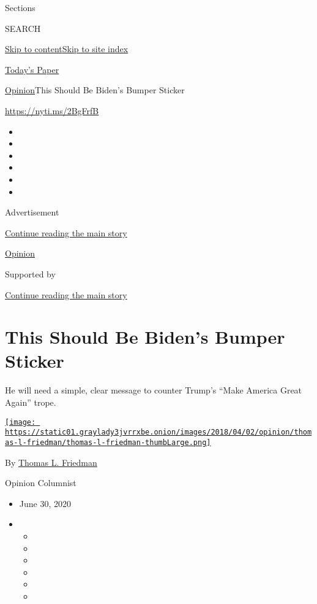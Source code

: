 Sections

SEARCH

\protect\hyperlink{site-content}{Skip to
content}\protect\hyperlink{site-index}{Skip to site index}

\href{https://myaccount.nytimes3xbfgragh.onion/auth/login?response_type=cookie\&client_id=vi}{}

\href{https://www.nytimes3xbfgragh.onion/section/todayspaper}{Today's
Paper}

\href{/section/opinion}{Opinion}\textbar{}This Should Be Biden's Bumper
Sticker

\url{https://nyti.ms/2BgFrfB}

\begin{itemize}
\item
\item
\item
\item
\item
\item
\end{itemize}

Advertisement

\protect\hyperlink{after-top}{Continue reading the main story}

\href{/section/opinion}{Opinion}

Supported by

\protect\hyperlink{after-sponsor}{Continue reading the main story}

\hypertarget{this-should-be-bidens-bumper-sticker}{%
\section{This Should Be Biden's Bumper
Sticker}\label{this-should-be-bidens-bumper-sticker}}

He will need a simple, clear message to counter Trump's ``Make America
Great Again'' trope.

\href{https://www.nytimes3xbfgragh.onion/by/thomas-l-friedman}{\texttt{[image: https://static01.graylady3jvrrxbe.onion/images/2018/04/02/opinion/thomas-l-friedman/thomas-l-friedman-thumbLarge.png]}}

By \href{https://www.nytimes3xbfgragh.onion/by/thomas-l-friedman}{Thomas
L. Friedman}

Opinion Columnist

\begin{itemize}
\item
  June 30, 2020
\item
  \begin{itemize}
  \item
  \item
  \item
  \item
  \item
  \item
  \end{itemize}
\end{itemize}

